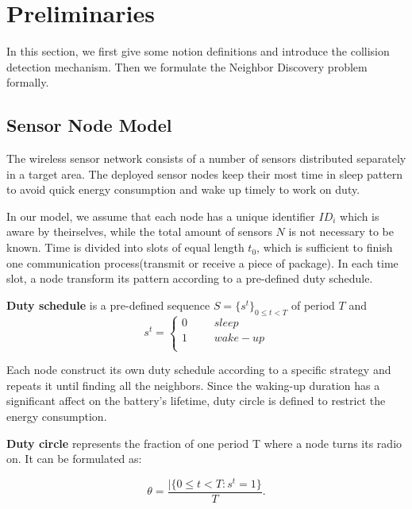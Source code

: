 \section{Preliminaries}
\label{sectionmodel}

In this section, we first give some notion definitions and introduce the collision detection mechanism. 
Then we formulate the Neighbor Discovery problem formally.  


\subsection{Sensor Node Model}

The wireless sensor network consists of a number of sensors distributed separately in a target area.
The deployed sensor nodes keep their most time in sleep pattern to avoid quick energy consumption 
and wake up timely to work on duty.

In our model, we assume that each node has a unique identifier $ID_i$ which is aware by theirselves, while the total amount of sensors $N$  is not necessary to be known. Time is divided into slots of equal length $t_0$, 
which is sufficient to finish  one communication process(transmit or receive a piece of package). In each time slot, a node transform its pattern according to a pre-defined duty schedule.

\begin{definition}
\textbf{Duty schedule} is a pre-defined sequence $S=\{s^t\}_{0\leq t<T}$ of period $T$ and
$$ s^t=\left\{
\begin{aligned}
0  & & & {sleep}\\
1  & & & {wake-up}\\
\end{aligned}
\right.
$$
\end{definition}

 Each node construct its own duty schedule according to a specific strategy and repeats it
 until finding all the neighbors. Since the waking-up duration has a significant affect on the battery's lifetime, 
 duty circle is defined to restrict the energy consumption.

\begin{definition}
\textbf{Duty circle} represents the fraction of one period T where a node turns its radio on. It can be formulated as:

$$\theta=\frac{|\{ 0\leq t<T : s^t =1\}}{T}.
$$
  
\end{definition}

